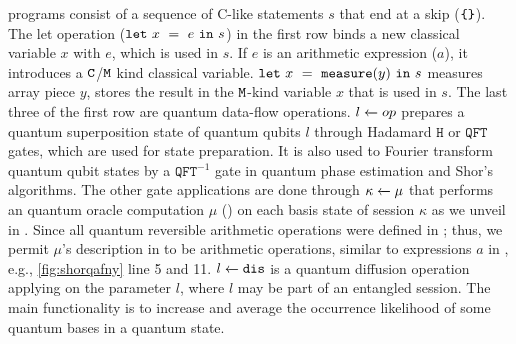 \qafny programs consist of a sequence of C-like statements $s$ that end at a skip ($\texttt{\{\}}$).
The let operation ($\texttt{let}~{x}~=~{e}~\texttt{in}~{s}$) in the first row binds a new classical variable $x$ with $e$, which is used in $s$. If $e$ is an arithmetic expression ($a$), it introduces a $\texttt{C}$/$\texttt{M}$ kind classical variable.
$\texttt{let}~{x}~=~{\texttt{measure}(y)}~\texttt{in}~{s}$ measures array piece $y$, stores the result in the $\texttt{M}$-kind variable $x$ that is used in $s$.
The last three of the first row are quantum data-flow operations.
${l} \xleftarrow{} {op}$ prepares a quantum superposition state of quantum qubits $l$ through Hadamard $\texttt{H}$ or $\texttt{QFT}$ gates, which are used for state preparation. It is also used to Fourier transform quantum qubit states by a $\texttt{QFT}^{-1}$ gate in quantum phase estimation and Shor's algorithms.
The other gate applications are done through ${\kappa} \xleftarrow{} {\mu}$ that performs an \oqasm quantum oracle computation $\mu$ (\cite{oracleoopsla}) on each basis state of session $\kappa$ as we unveil in . Since all quantum reversible arithmetic operations were defined in \oqasm; thus, we permit $\mu$'s description in \qafny to be arithmetic operations, similar to expressions $a$ in , e.g., \cref{fig:shorqafny} line 5 and 11.
${l} \xleftarrow{} {\texttt{dis}}$ is a quantum diffusion operation applying on the parameter $l$, where $l$ may be part of an entangled session.
The main functionality is to increase and average the occurrence likelihood of some quantum bases in a quantum state.

